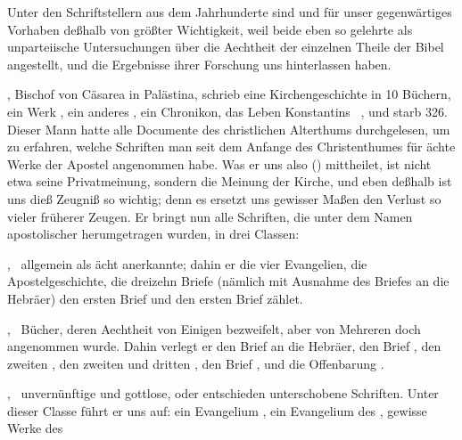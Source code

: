 Unter den Schriftstellern aus dem  Jahrhunderte sind  und  für unser gegenwärtiges Vorhaben deßhalb von größter Wichtigkeit, weil beide eben so gelehrte als unparteiische Untersuchungen über die Aechtheit der einzelnen Theile der Bibel angestellt, und die Ergebnisse ihrer Forschung uns hinterlassen haben.
\begin{aufza}
\item {}, Bischof von Cäsarea in Palästina, schrieb eine Kirchengeschichte in 10 Büchern, ein Werk , ein anderes , ein Chronikon, das Leben Konstantins \uma\ , und starb 326. Dieser Mann hatte alle Documente des christlichen Alterthums durchgelesen, um zu erfahren, welche Schriften man seit dem Anfange des Christenthumes für ächte Werke der Apostel angenommen habe. Was er uns also () mittheilet, ist nicht etwa seine Privatmeinung, sondern die Meinung der Kirche, und eben deßhalb ist uns dieß Zeugniß so wichtig; denn es ersetzt uns gewisser Maßen den Verlust so vieler früherer Zeugen. Er bringt nun alle Schriften, die unter dem Namen apostolischer herumgetragen wurden, in drei Classen:
\begin{aufzb}
\item {}, \dh\ allgemein als ächt anerkannte; dahin er die vier Evangelien, die Apostelgeschichte, die dreizehn Briefe  (nämlich mit Ausnahme des Briefes an die Hebräer) den ersten Brief  und den ersten Brief  zählet.
\item {}, \dh\ Bücher, deren Aechtheit von Einigen bezweifelt, aber von Mehreren doch angenommen wurde. Dahin verlegt er den Brief an die Hebräer, den Brief , den zweiten , den zweiten und dritten , den Brief , und die Offenbarung .
\item {}, \dh\ unvernünftige und gottlose, oder entschieden unterschobene Schriften. Unter dieser Classe führt er uns auf: ein Evangelium , ein Evangelium des , gewisse Werke des  \ua
\end{aufzb}

\end{aufza}
